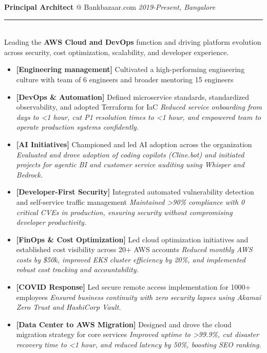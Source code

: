 \documentclass[11pt]{article}
\makeatletter
\newcommand{\roleheader}[3]{%
  {\large\sffamily\textbf{#1} @ #2} \hfill \textit{#3}\\[-0.3em]
  \color{myblue}\rule{\linewidth}{1pt}\\[0.5em]\color{bodytext}
}
\newenvironment{experiencebullets}{%
  \begin{itemize}[leftmargin=1.25em, itemsep=-0.25em]
    \renewcommand{\labelitemi}{\textbullet}
}{%
  \end{itemize}
}
\newenvironment{experience}[4]{%
  \roleheader{#1}{#2}{#3}%
  #4\vspace{0.5em}%
}{%
  \vspace{1em}
}
\newcommand{\expbullet}[3]{%
  \item \textbf{[#1]} {#2} \textrightarrow{} \textit{#3}%
}
\newcommand{\aexpbullet}[2]{%
  \item {#1} \textrightarrow{} \textit{#2}%
}
\makeatother
\begin{document}
\begin{experience}{Principal Architect}{Bankbazaar.com}{2019-Present, Bangalore}{%
    Leading the \textbf{AWS Cloud and DevOps} function and driving platform evolution across security, cost optimization, scalability, and developer experience.%
  }

  \begin{experiencebullets}

    \item \textbf{[Engineering management]} Cultivated a high-performing engineering culture with team of 6 engineers and broader mentoring 15 engineers
    {
    }

    \expbullet{DevOps \& Automation}{Defined microservice standards, standardized observability, and adopted Terraform for IaC}{Reduced service onboarding from days to <1 hour, cut P1 resolution times to <1 hour, and empowered team to operate production systems confidently.}

    \expbullet {AI Initiatives}{Championed and led AI adoption across the organization}
    {Evaluated and drove adoption of coding copilots (Cline.bot) and initiated projects for agentic BI and customer service auditing using Whisper and Bedrock.}

    \expbullet{Developer-First Security}{Integrated automated vulnerability detection and self-service traffic management}{Maintained >90\% compliance with 0 critical CVEs in production, ensuring security without compromising developer productivity.}

    \expbullet{FinOps \& Cost Optimization}{Led cloud optimization initiatives and established cost visibility across 20+ AWS accounts}{Reduced monthly AWS costs by \$50k, improved EKS cluster efficiency by 20\%, and implemented robust cost tracking and accountability.}

    \expbullet {COVID Response}{Led secure remote access implementation for 1000+ employees}
    {Ensured business continuity with zero security lapses using Akamai Zero Trust and HashiCorp Vault.}

    \expbullet {Data Center to AWS Migration}{Designed and drove the cloud migration strategy for core services}
    {Improved uptime to >99.9\%, cut disaster recovery time to <1 hour, and reduced latency by 50\%, boosting SEO ranking.}
  \end{experiencebullets}

\end{experience}
\end{document}
